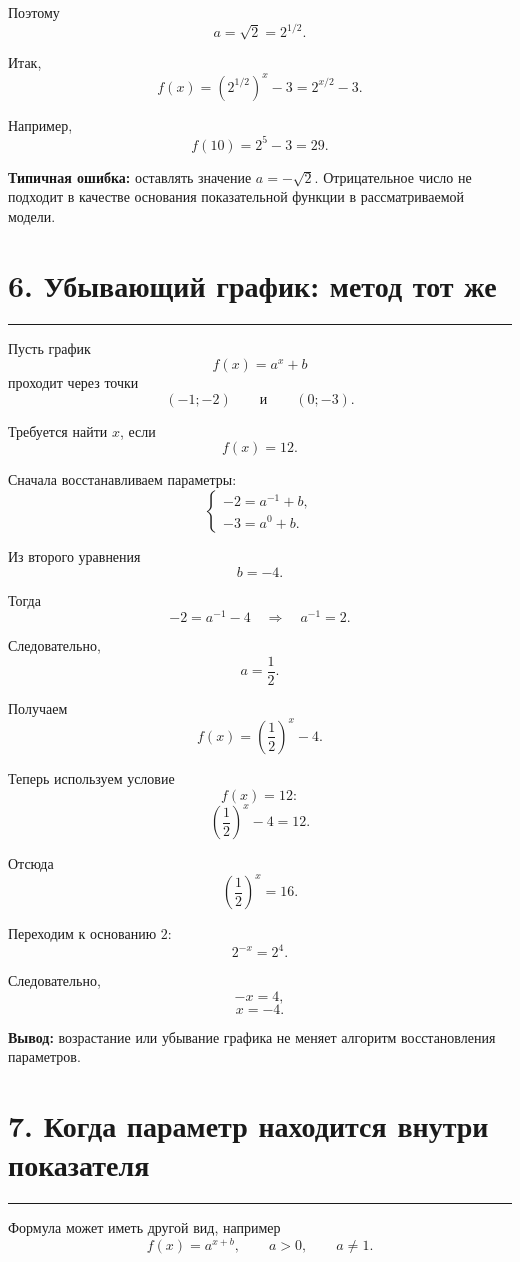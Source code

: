 \documentclass[a4paper,12pt]{article}
\newcommand{\sectionline}{%
  \vspace{-0.2em}
  \textcolor{accent}{\rule{\linewidth}{0.5pt}}
  \vspace{0.25em}
}
\newcommand{\key}[1]{\textbf{\textcolor{darkaccent}{#1}}}
\begin{document}
Поэтому
\[
    a=\sqrt2=2^{1/2}.
\]

Итак,
\[
    f(x)
    =
    \left(2^{1/2}\right)^x-3
    =
    2^{x/2}-3.
\]

Например,
\[
    f(10)
    =
    2^5-3
    =
    29.
\]

\key{Типичная ошибка:}
оставлять значение $a=-\sqrt2$.
Отрицательное число не подходит в качестве основания
показательной функции в рассматриваемой модели.


\section*{6. Убывающий график: метод тот же}
\sectionline

Пусть график
\[
    f(x)=a^x+b
\]
проходит через точки
\[
    (-1;-2)
    \qquad\text{и}\qquad
    (0;-3).
\]

Требуется найти $x$, если
\[
    f(x)=12.
\]

Сначала восстанавливаем параметры:
\[
\begin{cases}
-2=a^{-1}+b,\\
-3=a^0+b.
\end{cases}
\]

Из второго уравнения
\[
    b=-4.
\]

Тогда
\[
-2=a^{-1}-4
\quad\Longrightarrow\quad
a^{-1}=2.
\]

Следовательно,
\[
    a=\frac12.
\]

Получаем
\[
    f(x)
    =
    \left(\frac12\right)^x-4.
\]

Теперь используем условие
\[
    f(x)=12:
\]
\[
\left(\frac12\right)^x-4=12.
\]

Отсюда
\[
    \left(\frac12\right)^x=16.
\]

Переходим к основанию $2$:
\[
    2^{-x}=2^4.
\]

Следовательно,
\[
    -x=4,
\]
\[
    x=-4.
\]

\key{Вывод:}
возрастание или убывание графика
не меняет алгоритм восстановления параметров.


\section*{7. Когда параметр находится внутри показателя}
\sectionline

Формула может иметь другой вид, например
\[
    f(x)=a^{x+b},
    \qquad
    a>0,
    \qquad
    a\ne1.
\]
\end{document}
